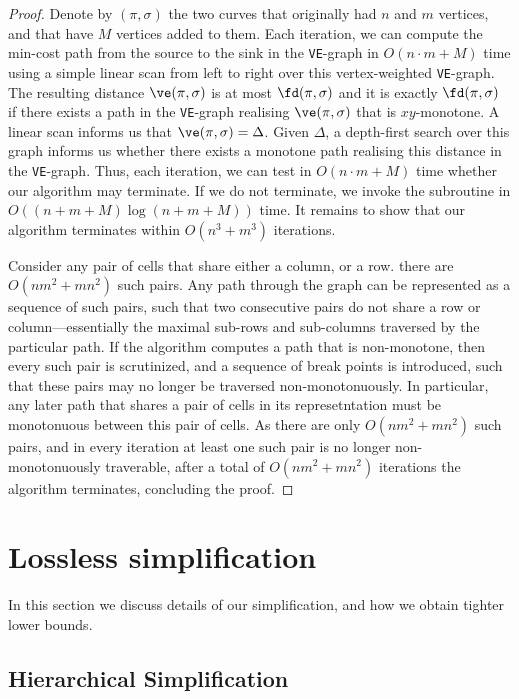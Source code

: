 \documentclass[english, thm-restate, notab]{lipics-v2021}
\begin{document}
\shootup*
\begin{proof}
    Denote by $(\pi, \sigma)$ the two curves that originally had $n$ and $m$ vertices, and that have $M$ vertices added to them. 
    Each iteration, we can compute the min-cost path from the source to the sink in the \texttt{VE}-graph in $O(n\cdot m + M)$ time using a simple linear scan from left to right over this vertex-weighted \texttt{VE}-graph.
    The resulting distance $\ve(\pi, \sigma)$ is at most $\fd(\pi, \sigma)$ and it is exactly $\fd(\pi, \sigma)$ if there exists a path in the \texttt{VE}-graph realising $\ve(\pi, \sigma)$ that is $xy$-monotone. 
    A linear scan informs us that $\ve(\pi, \sigma) = \Delta$.
    Given $\Delta$, a depth-first search over this graph informs us whether there exists a monotone path realising this distance in the \texttt{VE}-graph.
    Thus, each iteration, we can test in $O(n\cdot m + M)$ time whether our algorithm may terminate. 
    If we do not terminate, we invoke the subroutine in $O((n+m+M) \log (n+m+M))$ time. 
    It remains to show that our algorithm terminates  within $O(n^3+m^3)$ iterations. 

    Consider any pair of cells that share either a column, or a row. there are $O(nm^2 + mn^2)$ such pairs. Any path through the graph can be represented as a sequence of such pairs, such that two consecutive pairs do not share a row or column---essentially the maximal sub-rows and sub-columns traversed by the particular path. If the algorithm computes a path that is non-monotone, then every such pair is scrutinized, and a sequence of break points is introduced, such that these pairs may no longer be traversed non-monotonuously. In particular, any later path that shares a pair of cells in its represetntation must be monotonuous between this pair of cells. As there are only $O(nm^2 + mn^2)$ such pairs, and in every iteration at least one such pair is no longer non-monotonuously traverable, after a total of $O(nm^2 + mn^2)$ iterations the algorithm terminates, concluding the proof.
\end{proof}




\section{Lossless simplification}
\label{sec:lossless}

In this section we discuss details of our simplification, and how we obtain tighter lower bounds.

\subsection{Hierarchical Simplification}
\end{document}
